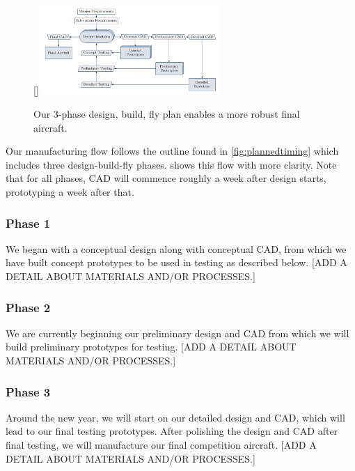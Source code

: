 \documentclass[proposal]{byu-aero}
\begin{document}
\begin{figure}
	\centering
	\raisebox{0pt}[\dimexpr{}\baselineskip\relax]{ %
		\includegraphics[width=0.6\textwidth]{manufacturing_flow}
	} %
	\caption{Our 3-phase design, build, fly plan enables a more robust final aircraft.}
	\label{fig:manufacturingplan}
\end{figure}

Our manufacturing flow follows the outline found in \cref{fig:plannedtiming} which includes three design-build-fly phases.   shows this flow with more clarity.  Note that for all phases, CAD will commence roughly a week after design starts, prototyping a week after that.

\subsubsection{Phase 1} We began with a conceptual design along with conceptual CAD, from which we have built concept prototypes to be used in testing as described below. {\color{BYUred}[ADD A DETAIL ABOUT MATERIALS AND/OR PROCESSES.]}

\subsubsection{Phase 2} We are currently beginning our preliminary design and CAD from which we will build preliminary prototypes for testing. {\color{BYUred}[ADD A DETAIL ABOUT MATERIALS AND/OR PROCESSES.]}

\subsubsection{Phase 3} Around the new year, we will start on our detailed design and CAD, which will lead to our final testing prototypes.  After polishing the design and CAD after final testing, we will manufacture our final competition aircraft. {\color{BYUred}[ADD A DETAIL ABOUT MATERIALS AND/OR PROCESSES.]}
\end{document}
